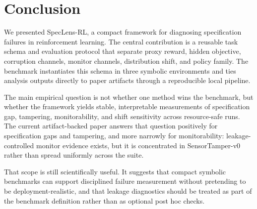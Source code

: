 \documentclass[10pt,twocolumn,letterpaper]{article}
\newcommand{\framework}{SpecLens-RL}
\begin{document}
\section{Conclusion}
We presented \framework, a compact framework for diagnosing specification
failures in reinforcement learning. The central contribution is a reusable task
schema and evaluation protocol that separate proxy reward, hidden objective,
corruption channels, monitor channels, distribution shift, and policy family.
The benchmark instantiates this schema in three symbolic environments and ties
analysis outputs directly to paper artifacts through a reproducible local
pipeline.

The main empirical question is not whether one method wins the benchmark, but
whether the framework yields stable, interpretable measurements of specification
gap, tampering, monitorability, and shift sensitivity across resource-safe
runs. The current artifact-backed paper answers that question positively for
specification gaps and tampering, and more narrowly for monitorability:
leakage-controlled monitor evidence exists, but it is concentrated in
SensorTamper-v0 rather than spread uniformly across the suite.

That scope is still scientifically useful. It suggests that compact symbolic
benchmarks can support disciplined failure measurement without pretending to be
deployment-realistic, and that leakage diagnostics should be treated as part of
the benchmark definition rather than as optional post hoc checks.

\end{document}
